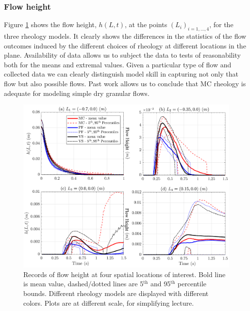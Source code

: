 \documentclass{article}
\begin{document}
\subsubsection{Flow height}
Figure \ref{fig:Ramp-H} shows the flow height, $h(L,t)$, at the points $(L_i)_{i=1,\dots,4}$, for the three rheology models. It clearly shows the differences in the statistics of the flow outcomes induced by the different choices of rheology at different locations in the plane. Availability of data allows us to subject the data to tests of reasonability both for the means and extremal values. Given a particular type of flow and collected data we can clearly distinguish model  skill in capturing not only that flow but also possible flows. Past work \cite{Webb2004} allows us to conclude that MC rheology is adequate for modeling simple dry granular flows. 
\begin{figure}[H]
         \centering
        \includegraphics[width=1\textwidth]{InclinedPlane/LocalMeasurments/Height.png}
        \caption{Records of flow height at four spatial locations of interest. Bold line is mean value, dashed/dotted lines are 5$^{\mathrm{th}}$ and 95$^{\mathrm{th}}$ percentile bounds. Different rheology models are displayed with different colors. Plots are at different scale, for simplifying lecture.}
        \label{fig:Ramp-H}
\end{figure}
\end{document}
